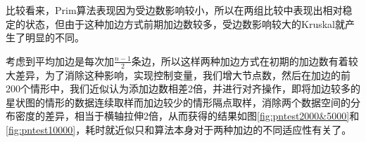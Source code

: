\documentclass[UTF8]{ctexart}
\begin{document}
比较看来，Prim算法表现因为受边数影响较小，所以在两组比较中表现出相对稳定的状态，但由于这种加边方式前期加边数较多，受边数影响较大的Kruskal就产生了明显的不同。

考虑到平均加边是每次加\(\frac{n-1}{2}\)条边，所以这样两种加边方式在初期的加边数有着较大差异，为了消除这种影响，实现控制变量，我们增大节点数，然后在加边的前200个情形中，我们近似认为添加边数相差2倍，并进行对齐操作，即将加边较多的星状图的情形的数据连续取样而加边较少的情形隔点取样，消除两个数据空间的分布密度的差异，相当于横轴拉伸2倍，从而获得的结果如图\ref{fig:pntest2000&5000}和\ref{fig:pntest10000}，耗时就近似只和算法本身对于两种加边的不同适应性有关了。

\begin{figure}[htbp]
    \centering
    

\end{figure}
\end{document}
